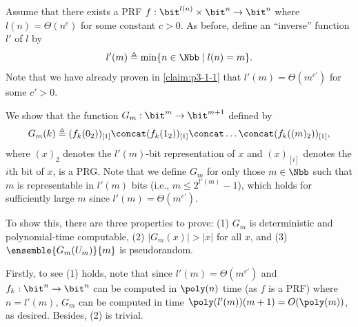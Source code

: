 












\begin{answer}[c]
    Assume that there exists a PRF $f: \bit^{l(n)}\times \bit^n\to \bit^n$ where  $l(n)=\Theta(n^c)$ for some constant $c\gt 0$. As before, define an ``inverse'' function $l'$ of $l$ by
    \[
        l'(m)\triangleq \min\{n\in \Nbb \mid l(n)=m\}.
    \]
    Note that we have already proven in \autoref{claim:p3-1-1} that $l'(m)=\Theta(m^{c'})$ for some $c'\gt 0$.

    We show that the function $G_m:\bit^m\to \bit^{m+1}$ defined by
    \[
        G_m(k) \triangleq  ({f}_{k}(0_2))_{[1]}\concat  ({f}_{k}(1_2))_{[1]}\concat \ldots \concat ({f}_{k}((m)_2))_{[1]},
    \]
    where $(x)_2$ denotes the $l'(m)$-bit representation of $x$ and $(x)_{[i]}$ denotes the $i$th bit of $x$, is a PRG. Note that we define $G_m$ for only those $m\in \Nbb$ such that $m$ is representable in $l'(m)$ bits (i.e., $m\le 2^{l'(m)}-1$), which holds for sufficiently large $m$ since $l'(m)=\Theta(m^{c'})$.
    
    To show this, there are three properties to prove: (1) $G_m$ is deterministic and polynomial-time computable, (2) $|G_m(x)|\gt |x|$ for all $x$, and (3) $\ensemble{G_m(U_m)}{m}$ is pseudorandom.

    Firstly, to see (1) holds, note that since $l'(m)=\Theta(m^{c'})$ and $f_k:\bit^n\to\bit^n$ can be computed in $\poly(n)$ time (as $f$ is a PRF) where $n=l'(m)$,  $G_m$ can be computed in time $\poly(l'(m))(m+1)=O(\poly(m))$, as desired.
    Besides, (2) is trivial.
    

\end{answer}
